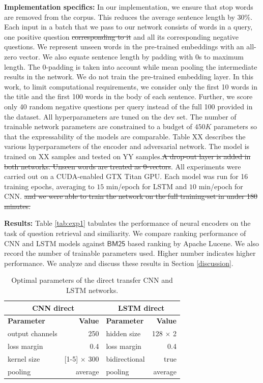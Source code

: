 \documentclass{sigkddExp}
\begin{document}
\textbf{Implementation specifics:}
In our implementation, we ensure that stop words are removed from the corpus. This reduces the average sentence length by 30\%. Each input in a batch that we pass to our network consists of words in a query, one positive question {\color{red} \st{corresponding to it}} and all its corresponding negative questions. {\color{red} We represent unseen words in the pre-trained embeddings with an all-zero vector. We also equate sentence length by padding with $0$s to maximum length}. The 0-padding is taken into account while mean pooling the intermediate results in the network. We do not train the pre-trained embedding layer. In this work, to limit computational requirements, we consider only the first 10 words in the title and the first 100 words in the body of each sentence. Further, we score only 40 random negative questions per query instead of the full 100 provided in the dataset. All hyperparameters are tuned on the dev set. The number of trainable network parameters are constrained to a budget of $450K$ parameters so that the expressability of the models are comparable. Table {\color{red} XX} describes the various hyperparameters of the encoder and adversarial network. The model is trained on {\color{red} XX samples and tested on YY samples.\st{A drop-out layer is added in both networks. Unseen words are treated as 0-vectors}. All experiments were carried out on a CUDA-enabled GTX Titan GPU. Each model was run for {\color{red} 16 training epochs, averaging to $15$ min/epoch for LSTM and $10$ min/epoch for CNN. \st{and we were able to train the network on the full training-set in under 180 minutes.}}}

\textbf{Results:}
Table \ref{tab:exp1} tabulates the performance of neural encoders on the task of question retrieval and similiarity. {\color{red}We compare ranking performance of CNN and LSTM models against $\textsf{BM25}$ based ranking by Apache Lucene. We also record the number of trainable parameters used. Higher number indicates higher performance.} We analyze and discuss these results in Section \ref{discussion}.


\begin{table}[h]
\begin{tabular}{l|r|l|r}
      \multicolumn{2}{c|}{\textbf{CNN direct}}
     & \multicolumn{2}{c}{\textbf{LSTM direct}}
     \\
     \toprule
     \textbf{Parameter}
     & \textbf{Value}
     & \textbf{Parameter}
     & \textbf{Value}
     \\
     \midrule
     output channels
     & 250
     & hidden size
     & 128 $\times$ 2
     \\
     loss margin
     & 0.4
     & loss margin
     & 0.4
     \\
     kernel size
     & [1-5] $\times$ 300
     & bidirectional
     & true
     \\
     pooling
     & average
     & pooling
     & average
\end{tabular}
\caption{Optimal parameters of the direct transfer CNN and LSTM networks.}
\label{tab:param_direct}
\end{table}
\end{document}
